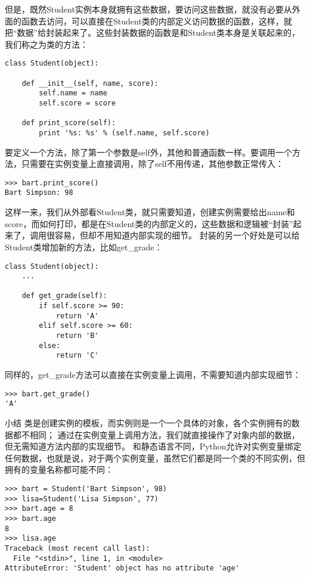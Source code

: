 \documentclass[twoside,11pt]{book}
\begin{document}
但是，既然Student实例本身就拥有这些数据，要访问这些数据，就没有必要从外面的函数去访问，可以直接在Student类的内部定义访问数据的函数，这样，就把“数据”给封装起来了。这些封装数据的函数是和Student类本身是关联起来的，我们称之为类的方法：
\begin{lstlisting}
class Student(object):

    def __init__(self, name, score):
        self.name = name
        self.score = score

    def print_score(self):
        print '%s: %s' % (self.name, self.score)
\end{lstlisting}

要定义一个方法，除了第一个参数是self外，其他和普通函数一样。要调用一个方法，只需要在实例变量上直接调用，除了self不用传递，其他参数正常传入：
\begin{lstlisting}
>>> bart.print_score()
Bart Simpson: 98
\end{lstlisting}

这样一来，我们从外部看Student类，就只需要知道，创建实例需要给出name和score，而如何打印，都是在Student类的内部定义的，这些数据和逻辑被“封装”起来了，调用很容易，但却不用知道内部实现的细节。
封装的另一个好处是可以给Student类增加新的方法，比如get\_grade：
\begin{lstlisting}
class Student(object):
    ...

    def get_grade(self):
        if self.score >= 90:
            return 'A'
        elif self.score >= 60:
            return 'B'
        else:
            return 'C'
\end{lstlisting}

同样的，get\_grade方法可以直接在实例变量上调用，不需要知道内部实现细节：
\begin{lstlisting}
>>> bart.get_grade()
'A'
\end{lstlisting}

小结
类是创建实例的模板，而实例则是一个一个具体的对象，各个实例拥有的数据都不相同；
通过在实例变量上调用方法，我们就直接操作了对象内部的数据，但无需知道方法内部的实现细节。
和静态语言不同，Python允许对实例变量绑定任何数据，也就是说，对于两个实例变量，虽然它们都是同一个类的不同实例，但拥有的变量名称都可能不同：
\begin{lstlisting}
>>> bart = Student('Bart Simpson', 98)
>>> lisa=Student('Lisa Simpson', 77)
>>> bart.age = 8
>>> bart.age
8
>>> lisa.age
Traceback (most recent call last):
  File "<stdin>", line 1, in <module>
AttributeError: 'Student' object has no attribute 'age'
\end{lstlisting}
\end{document}
